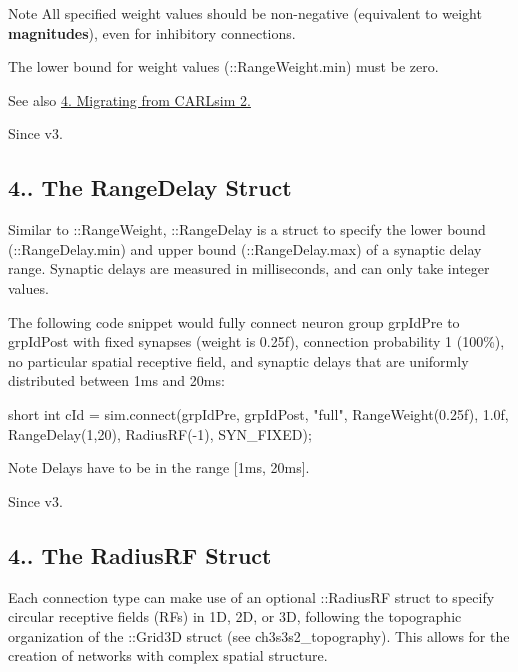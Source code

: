 \begin{DoxyNote}{Note}
All specified weight values should be non-\/negative (equivalent to weight {\bfseries magnitudes}), even for inhibitory connections. 

The lower bound for weight values (\+::\+Range\+Weight.\+min) must be zero. 
\end{DoxyNote}
\begin{DoxySeeAlso}{See also}
\hyperlink{ch4_connections_ch4s4_migrating_connect}{4. Migrating from C\+A\+R\+Lsim 2.} 
\end{DoxySeeAlso}
\begin{DoxySince}{Since}
v3.
\end{DoxySince}
\hypertarget{ch4_connections_ch4s1s2_range_delay}{}\subsection{4.. The Range\+Delay Struct}\label{ch4_connections_ch4s1s2_range_delay}
Similar to \+::\+Range\+Weight, \+::\+Range\+Delay is a struct to specify the lower bound (\+::\+Range\+Delay.\+min) and upper bound (\+::\+Range\+Delay.\+max) of a synaptic delay range. Synaptic delays are measured in milliseconds, and can only take integer values.

The following code snippet would fully connect neuron group {\ttfamily grp\+Id\+Pre} to {\ttfamily grp\+Id\+Post} with fixed synapses (weight is 0.\+25f), connection probability 1 (100\%), no particular spatial receptive field, and synaptic delays that are uniformly distributed between 1ms and 20ms\+: 
\begin{DoxyCode}
\textcolor{keywordtype}{short} \textcolor{keywordtype}{int} cId = sim.connect(grpIdPre, grpIdPost, \textcolor{stringliteral}{"full"}, RangeWeight(0.25f), 1.0f, RangeDelay(1,20),
    RadiusRF(-1), SYN\_FIXED);
\end{DoxyCode}


\begin{DoxyNote}{Note}
Delays have to be in the range \mbox{[}1ms, 20ms\mbox{]}. 
\end{DoxyNote}
\begin{DoxySince}{Since}
v3.
\end{DoxySince}
\hypertarget{ch4_connections_ch4s1s3_radiusRF}{}\subsection{4.. The Radius\+R\+F Struct}\label{ch4_connections_ch4s1s3_radiusRF}
Each connection type can make use of an optional \+::\+Radius\+RF struct to specify circular receptive fields (R\+Fs) in 1D, 2D, or 3D, following the topographic organization of the \+::\+Grid3D struct (see ch3s3s2\+\_\+topography). This allows for the creation of networks with complex spatial structure.

